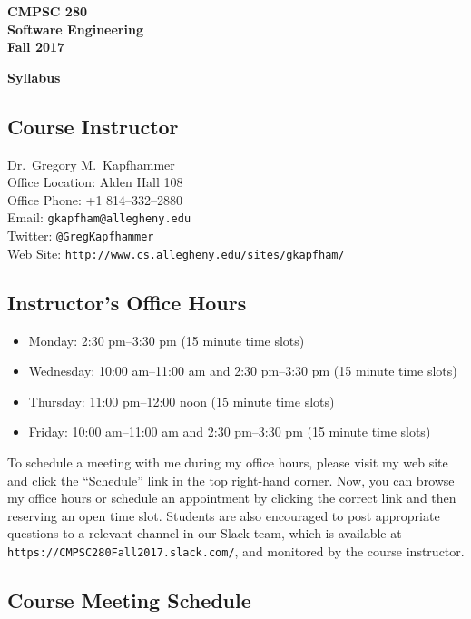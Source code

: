 \documentclass[11pt]{article}
\newcommand{\url}[1]{\lstinline{#1}}
\newcommand{\syllabustitle}[1]
{
  \begin{center}
    \begin{center}
      \bf
      CMPSC 280\\Software Engineering\\
      Fall 2017\\
      \medskip
    \end{center}
    \bf
    #1
  \end{center}
}
\begin{document}
\thispagestyle{empty}

\syllabustitle{Syllabus}

\subsection*{Course Instructor}
Dr.\ Gregory M.\ Kapfhammer\\
\noindent Office Location: Alden Hall 108 \\
\noindent Office Phone: +1 814--332--2880 \\
\noindent Email: \url{gkapfham@allegheny.edu} \\
\noindent Twitter: \url{@GregKapfhammer} \\
\noindent Web Site: \url{http://www.cs.allegheny.edu/sites/gkapfham/}

\subsection*{Instructor's Office Hours}

\begin{itemize}
  \itemsep0em

  \item Monday: 2:30 pm--3:30 pm (15 minute time slots)

  \item Wednesday: 10:00 am--11:00 am and 2:30 pm--3:30 pm (15 minute time slots)

  \item Thursday: 11:00 pm--12:00 noon (15 minute time slots)

  \item Friday: 10:00 am--11:00 am and 2:30 pm--3:30 pm (15 minute time slots)

\end{itemize}

\noindent To schedule a meeting with me during my office hours, please visit my web site and click the ``Schedule'' link
in the top right-hand corner. Now, you can browse my office hours or schedule an appointment by clicking the correct
link and then reserving an open time slot. Students are also encouraged to post appropriate questions to a relevant
channel in our Slack team, which is available at \url{https://CMPSC280Fall2017.slack.com/}, and monitored by the course
instructor.

\subsection*{Course Meeting Schedule}
\end{document}
